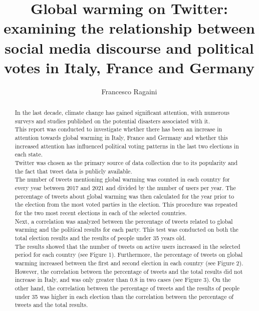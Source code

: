 \documentclass[a4paper,11pt,rmp,superscriptaddress]{revtex4}
\begin{document}
\title{Global warming on Twitter: examining the relationship between social media discourse and political votes in Italy, 
France and Germany}
\author{Francesco Ragaini}

\begin{abstract}

    In the last decade, climate change has gained significant attention, with numerous surveys and studies 
    published on the potential disasters associated with it.\\
    This report was conducted to investigate whether there has been an increase in attention towards global warming in Italy, 
    France and Germany and whether this increased attention has influenced political voting patterns in the last two elections in 
    each state.\\
    Twitter was chosen as the primary source of data collection due to its popularity and the fact that tweet data is publicly available.\\ 
    The number of tweets mentioning global warming was counted in each country for every year between 2017 and 2021 and 
    divided by the number of users per year.
    The percentage of tweets about global warming was then calculated for the year prior to the election from the most 
    voted parties in the election.
    This procedure was repeated for the two most recent elections in each of the selected countries.\\
    Next, a correlation was analyzed between the percentage of tweets related to global warming and the political results for each party. 
    This test was conducted on both the total election results and the results of people under 35 years old.\\
    The results showed that the number of tweets on active users increased in the selected period for each country (see Figure 1). 
    Furthermore, the percentage of tweets on global warming increased between the first and second election in each country (see Figure 2).
    However, the correlation between the percentage of tweets and the total results did not increase in Italy, 
    and was only greater than 0.8 in two cases (see Figure 3). 
    On the other hand, the correlation between the percentage of tweets and the results of people under 35 was higher in 
    each election than the correlation between the percentage of tweets and the total results.\\

\end{abstract}


\maketitle
\end{document}
